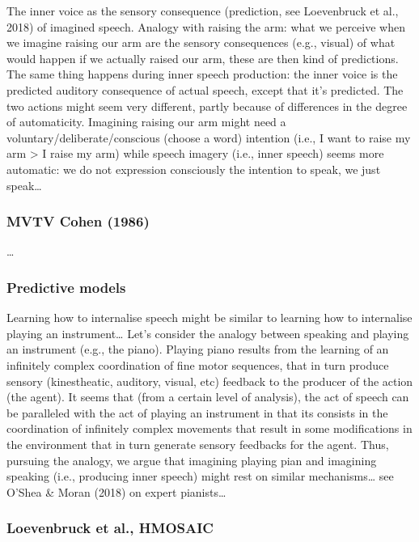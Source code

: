 \documentclass[a4paper,12pt,oneside,oldfontcommands]{memoir}
\begin{document}
The inner voice as the sensory consequence (prediction, see Loevenbruck
et al., 2018) of imagined speech. Analogy with raising the arm: what we
perceive when we imagine raising our arm are the sensory consequences
(e.g., visual) of what would happen if we actually raised our arm, these
are then kind of predictions. The same thing happens during inner speech
production: the inner voice is the predicted auditory consequence of
actual speech, except that it's predicted. The two actions might seem
very different, partly because of differences in the degree of
automaticity. Imagining raising our arm might need a
voluntary/deliberate/conscious (choose a word) intention (i.e., I want
to raise my arm \textgreater{} I raise my arm) while speech imagery
(i.e., inner speech) seems more automatic: we do not expression
consciously the intention to speak, we just speak\ldots{}

\subsubsection{MVTV Cohen (1986)}\label{mvtv-cohen-1986}

\ldots{}

\subsubsection{Predictive models}\label{predictive-models}

Learning how to internalise speech might be similar to learning how to
internalise playing an instrument\ldots{} Let's consider the analogy
between speaking and playing an instrument (e.g., the piano). Playing
piano results from the learning of an infinitely complex coordination of
fine motor sequences, that in turn produce sensory (kinestheatic,
auditory, visual, etc) feedback to the producer of the action (the
agent). It seems that (from a certain level of analysis), the act of
speech can be paralleled with the act of playing an instrument in that
its consists in the coordination of infinitely complex movements that
result in some modifications in the environment that in turn generate
sensory feedbacks for the agent. Thus, pursuing the analogy, we argue
that imagining playing pian and imagining speaking (i.e., producing
inner speech) might rest on similar mechanisms\ldots{} see O'Shea \&
Moran (2018) on expert pianists\ldots{}

\subsubsection{Loevenbruck et al.,
HMOSAIC}\label{loevenbruck-et-al.-hmosaic}
\end{document}
